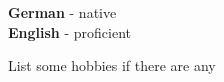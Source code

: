 \documentclass[9pt]{developercv} %
\begin{document}
\begin{minipage}[t]{0.5\textwidth}
	\vspace{-\baselineskip} %


	\textbf{German} - native\\
	\textbf{English} - proficient\\
\end{minipage}
\hfill
\begin{minipage}[t]{0.5\textwidth}
	\vspace{-\baselineskip} %


	List some hobbies
	if there are any
\end{minipage}

\end{document}

